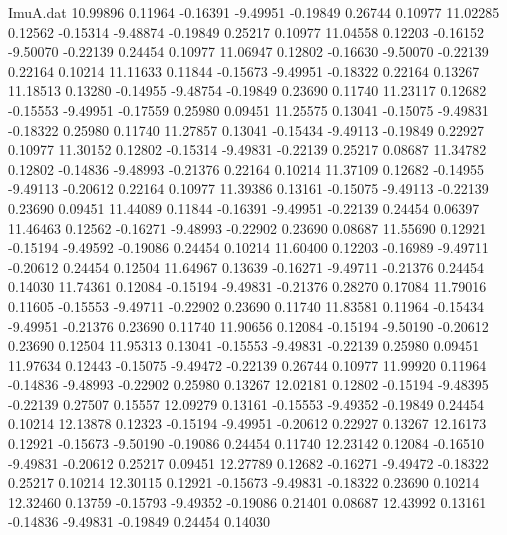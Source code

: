 \begin{filecontents}{ImuA.dat}
  10.99896    0.11964   -0.16391   -9.49951   -0.19849    0.26744    0.10977
  11.02285    0.12562   -0.15314   -9.48874   -0.19849    0.25217    0.10977
  11.04558    0.12203   -0.16152   -9.50070   -0.22139    0.24454    0.10977
  11.06947    0.12802   -0.16630   -9.50070   -0.22139    0.22164    0.10214
  11.11633    0.11844   -0.15673   -9.49951   -0.18322    0.22164    0.13267
  11.18513    0.13280   -0.14955   -9.48754   -0.19849    0.23690    0.11740
  11.23117    0.12682   -0.15553   -9.49951   -0.17559    0.25980    0.09451
  11.25575    0.13041   -0.15075   -9.49831   -0.18322    0.25980    0.11740
  11.27857    0.13041   -0.15434   -9.49113   -0.19849    0.22927    0.10977
  11.30152    0.12802   -0.15314   -9.49831   -0.22139    0.25217    0.08687
  11.34782    0.12802   -0.14836   -9.48993   -0.21376    0.22164    0.10214
  11.37109    0.12682   -0.14955   -9.49113   -0.20612    0.22164    0.10977
  11.39386    0.13161   -0.15075   -9.49113   -0.22139    0.23690    0.09451
  11.44089    0.11844   -0.16391   -9.49951   -0.22139    0.24454    0.06397
  11.46463    0.12562   -0.16271   -9.48993   -0.22902    0.23690    0.08687
  11.55690    0.12921   -0.15194   -9.49592   -0.19086    0.24454    0.10214
  11.60400    0.12203   -0.16989   -9.49711   -0.20612    0.24454    0.12504
  11.64967    0.13639   -0.16271   -9.49711   -0.21376    0.24454    0.14030
  11.74361    0.12084   -0.15194   -9.49831   -0.21376    0.28270    0.17084
  11.79016    0.11605   -0.15553   -9.49711   -0.22902    0.23690    0.11740
  11.83581    0.11964   -0.15434   -9.49951   -0.21376    0.23690    0.11740
  11.90656    0.12084   -0.15194   -9.50190   -0.20612    0.23690    0.12504
  11.95313    0.13041   -0.15553   -9.49831   -0.22139    0.25980    0.09451
  11.97634    0.12443   -0.15075   -9.49472   -0.22139    0.26744    0.10977
  11.99920    0.11964   -0.14836   -9.48993   -0.22902    0.25980    0.13267
  12.02181    0.12802   -0.15194   -9.48395   -0.22139    0.27507    0.15557
  12.09279    0.13161   -0.15553   -9.49352   -0.19849    0.24454    0.10214
  12.13878    0.12323   -0.15194   -9.49951   -0.20612    0.22927    0.13267
  12.16173    0.12921   -0.15673   -9.50190   -0.19086    0.24454    0.11740
  12.23142    0.12084   -0.16510   -9.49831   -0.20612    0.25217    0.09451
  12.27789    0.12682   -0.16271   -9.49472   -0.18322    0.25217    0.10214
  12.30115    0.12921   -0.15673   -9.49831   -0.18322    0.23690    0.10214
  12.32460    0.13759   -0.15793   -9.49352   -0.19086    0.21401    0.08687
  12.43992    0.13161   -0.14836   -9.49831   -0.19849    0.24454    0.14030

\end{filecontents}
